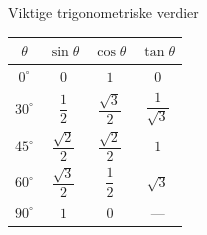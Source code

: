 \documentclass[aspectratio=169, 12pt]{beamer}
\begin{document}
\begin{frame}{Viktige trigonometriske verdier}

  \begin{center}
  \renewcommand{\arraystretch}{1.5}
  \begin{tabular}{|c|c|c|c|}
  \hline
  \rowcolor{blue!10!black!80}
  $\theta$ & $\sin\theta$ & $\cos\theta$ & $\tan\theta$ \\
  \hline
  $0^\circ$  & $0$ & $1$ & $0$ \\
  \hline
  $30^\circ$ & $\dfrac{1}{2}$ & $\dfrac{\sqrt{3}}{2}$ & $\dfrac{1}{\sqrt{3}}$ \\
  \hline
  $45^\circ$ & $\dfrac{\sqrt{2}}{2}$ & $\dfrac{\sqrt{2}}{2}$ & $1$ \\
  \hline
  $60^\circ$ & $\dfrac{\sqrt{3}}{2}$ & $\dfrac{1}{2}$ & $\sqrt{3}$ \\
  \hline
  $90^\circ$ & $1$ & $0$ & --- \\
  \hline
  \end{tabular}
  \end{center}

\end{frame}
\end{document}
